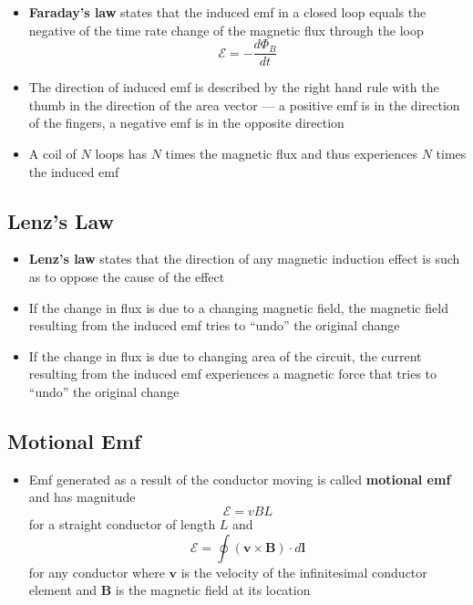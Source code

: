 \documentclass{article}
\begin{document}
\begin{itemize}
  \item \textbf{Faraday's law} states that the induced emf in a closed loop equals the negative of the time rate change of the magnetic flux through the loop \[\mathcal{E} = -\frac{d \Phi_B}{dt}\]

  \item The direction of induced emf is described by the right hand rule with the thumb in the direction of the area vector — a positive emf is in the direction of the fingers, a negative emf is in the opposite direction

  \item A coil of $N$ loops has $N$ times the magnetic flux and thus experiences $N$ times the induced emf
\end{itemize}

\subsection{Lenz's Law}

\begin{itemize}
  \item \textbf{Lenz's law} states that the direction of any magnetic induction effect is such as to oppose the cause of the effect

  \item If the change in flux is due to a changing magnetic field, the magnetic field resulting from the induced emf tries to ``undo'' the original change

  \item If the change in flux is due to changing area of the circuit, the current resulting from the induced emf experiences a magnetic force that tries to ``undo'' the original change
\end{itemize}

\subsection{Motional Emf}

\begin{itemize}
  \item Emf generated as a result of the conductor moving is called \textbf{motional emf} and has magnitude \[\mathcal{E} = v B L\] for a straight conductor of length $L$ and \[\mathcal{E} = \oint (\mathbf{v} \times \mathbf{B}) \cdot d\mathbf{l}\] for any conductor where $\mathbf{v}$ is the velocity of the infinitesimal conductor element and $\mathbf{B}$ is the magnetic field at its location
\end{itemize}
\end{document}
